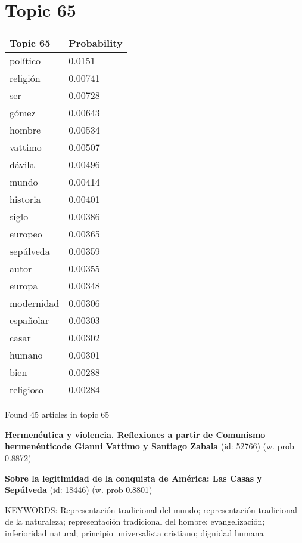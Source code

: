 \documentclass{article}
\begin{document}
\vfill
\newpage


\centering
\thispagestyle{empty}
\section*{Topic 65}\vfill
\begin{tabular}{ll}
\toprule
   Topic 65 & Probability \\
\midrule
   político &      0.0151 \\
   religión &     0.00741 \\
        ser &     0.00728 \\
      gómez &     0.00643 \\
     hombre &     0.00534 \\
    vattimo &     0.00507 \\
     dávila &     0.00496 \\
      mundo &     0.00414 \\
   historia &     0.00401 \\
      siglo &     0.00386 \\
    europeo &     0.00365 \\
  sepúlveda &     0.00359 \\
      autor &     0.00355 \\
     europa &     0.00348 \\
 modernidad &     0.00306 \\
  españolar &     0.00303 \\
      casar &     0.00302 \\
     humano &     0.00301 \\
       bien &     0.00288 \\
  religioso &     0.00284 \\
\bottomrule
\end{tabular}

\vfill
Found 45 articles in topic 65
\vfill

\textbf{Hermenéutica y violencia.  Reflexiones a partir de  Comunismo hermenéuticode  Gianni Vattimo y Santiago  Zabala} (id: 52766)
 (w. prob 0.8872)
\vfill

\textbf{Sobre la legitimidad de la conquista de América: Las Casas y Sepúlveda} (id: 18446)
 (w. prob 0.8801)


KEYWORDS:
Representación tradicional del mundo; representación tradicional de la naturaleza; representación tradicional del hombre; evangelización; inferioridad natural; principio universalista cristiano; dignidad humana
\vfill
\end{document}
